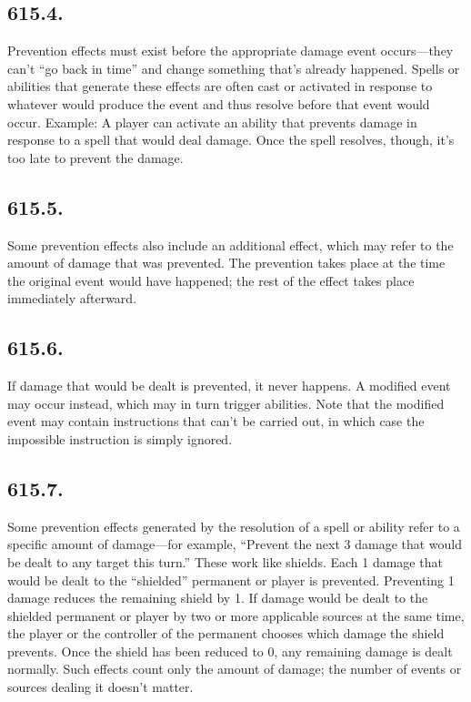 \subsection*{615.4.}
Prevention effects must exist before the appropriate damage event occurs—they can’t “go back in time” and change something that’s already happened. Spells or abilities that generate these effects are often cast or activated in response to whatever would produce the event and thus resolve before that event would occur.
Example: A player can activate an ability that prevents damage in response to a spell that would deal damage. Once the spell resolves, though, it’s too late to prevent the damage.

\subsection*{615.5.}
Some prevention effects also include an additional effect, which may refer to the amount of damage that was prevented. The prevention takes place at the time the original event would have happened; the rest of the effect takes place immediately afterward.

\subsection*{615.6.}
If damage that would be dealt is prevented, it never happens. A modified event may occur instead, which may in turn trigger abilities. Note that the modified event may contain instructions that can’t be carried out, in which case the impossible instruction is simply ignored.

\subsection*{615.7.}
Some prevention effects generated by the resolution of a spell or ability refer to a specific amount of damage—for example, “Prevent the next 3 damage that would be dealt to any target this turn.” These work like shields. Each 1 damage that would be dealt to the “shielded” permanent or player is prevented. Preventing 1 damage reduces the remaining shield by 1. If damage would be dealt to the shielded permanent or player by two or more applicable sources at the same time, the player or the controller of the permanent chooses which damage the shield prevents. Once the shield has been reduced to 0, any remaining damage is dealt normally. Such effects count only the amount of damage; the number of events or sources dealing it doesn’t matter.

